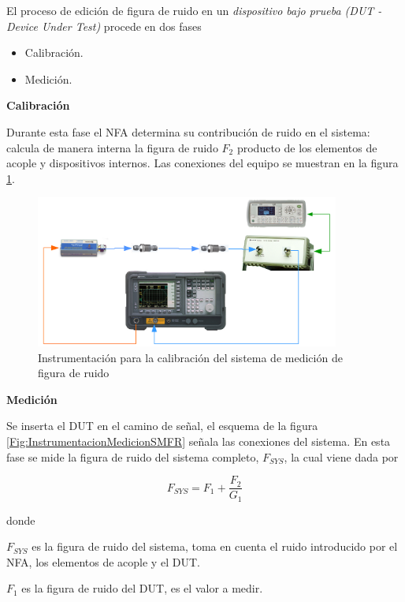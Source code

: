 \documentclass{article}
\begin{document}
	El proceso de edición de figura de ruido en un \emph{dispositivo bajo prueba (DUT - Device Under Test)} procede en dos fases
	
	\begin{itemize}
		\item Calibración.
		\item Medición. 
	\end{itemize}

	\noindent \textbf{Calibración}
	
	Durante esta fase el NFA determina su contribución de ruido en el sistema: calcula de manera interna la figura de ruido $F_2$ producto de los elementos de acople y dispositivos internos. Las conexiones del equipo se muestran en la figura \ref{Fig:InstrumentacionCalibracionSMFR}.
	
	\begin{figure}[h!]
		\centering
		\includegraphics[width=10cm]{Imagenes/InstrumentacionCalibracionFiguraRuido.pdf}
		\caption{Instrumentación para la calibración del sistema de medición de figura de ruido}
		\label{Fig:InstrumentacionCalibracionSMFR}
	\end{figure}

	\noindent \textbf{Medición}
	
	Se inserta el DUT en el camino de señal, el esquema de la figura \ref{Fig:InstrumentacionMedicionSMFR} señala las conexiones del sistema. En esta fase se mide la figura de ruido del sistema completo, $F_{SYS}$, la cual viene dada por
	
	\begin{equation}
		F_{SYS} = F_1 + \frac{F_2}{G_1}
		\label{Ec:FiguraRuidoSistema}
	\end{equation}
	
	\noindent donde
	
	\noindent $F_{SYS}$ es la figura de ruido del sistema, toma en cuenta el ruido introducido por el NFA, los elementos de acople y el DUT.
	
	\noindent $F_1$ es la figura de ruido del DUT, es el valor a medir.
	
\end{document}
